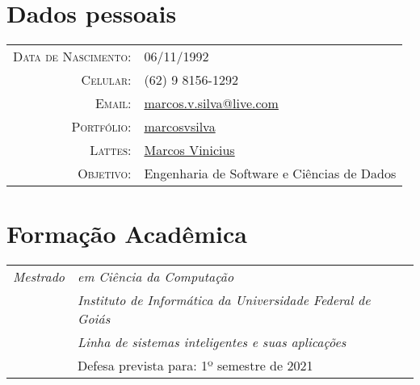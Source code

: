 \documentclass[12pt, oneside, openany, a4paper, english, brazil]{abntex2}
\begin{document}
\pagestyle{empty} 


\begin{center}
    \par{
    \par}
\end{center}

\section{Dados pessoais}

\begin{tabular}{rl}
	\textsc{Data de Nascimento:} & 06/11/1992\\
	\textsc{Celular:} & (62) 9 8156-1292\\
	\textsc{Email:} & \href{mailto:marcos.v.silva@live.com}{marcos.v.silva@live.com} \\
	\textsc{Portfólio:} & \href{https://github.com/marcosvsilva}{marcosvsilva} \\
	\textsc{Lattes:} & \href{ http://lattes.cnpq.br/6930019751033452}{Marcos Vinicius} \\
	\textsc{Objetivo:} & Engenharia de Software e Ciências de Dados \\
\end{tabular}


\section{Formação Acadêmica}

\begin{tabular}{p{2.2cm}|p{12cm}}
    \emph{Mestrado}
    & \emph{em Ciência da Computação} \\
    & \emph{Instituto de Informática da Universidade Federal de Goiás} \\
    & \emph{Linha de sistemas inteligentes e suas aplicações} \\
    & Defesa prevista para: 1º semestre de 2021 \\
\end{tabular}
\end{document}
